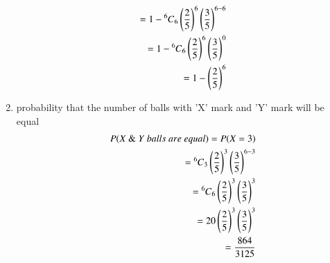 \documentclass[journal,12pt,twocolumn]{IEEEtran}
\begin{document}
\begin{enumerate}
\begin{equation*}
\begin{split}
    = 1 - \Mycomb[6]{6} \left(\frac{2}{5}\right)^6 \left(\frac{3}{5}\right)^{6-6}\\
    = 1 - \Mycomb[6]{6} \left(\frac{2}{5}\right)^6 \left(\frac{3}{5}\right)^{0}\\
    = 1 - \left(\frac{2}{5}\right)^6
\end{split}
\end{equation*}
\item probability that the number of balls with ’X’ mark and
’Y’ mark will be equal
\begin{equation*}
\begin{split}
     P(X~\&~Y~balls~are~equal) = P(X=3)\\
    = \Mycomb[6]{3} \left(\frac{2}{5}\right)^3 \left(\frac{3}{5}\right)^{6-3}\\
    = \Mycomb[6]{6} \left(\frac{2}{5}\right)^3 \left(\frac{3}{5}\right)^{3}\\
    = 20 \left(\frac{2}{5}\right)^3 \left(\frac{3}{5}\right)^{3}\\
    = \frac{864}{3125}
\end{split}
\end{equation*}
\end{enumerate}
\end{document}
